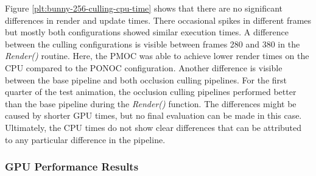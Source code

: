 \noindent
Figure \ref{plt:bunny-256-culling-cpu-time} shows that there are no significant differences in render and update times.
There occasional spikes in different frames but mostly both configurations showed similar execution times. A difference 
between the culling configurations is visible between frames 280 and 380 in the \emph{Render()} routine. Here, the 
\ac{PMOC} was able to achieve lower render times on the \ac{CPU} compared to the \ac{PONOC} configuration. Another 
difference is visible between the base pipeline and both occlusion culling pipelines. For the first quarter of the test 
animation, the occlusion culling pipelines performed better than the base pipeline during the \emph{Render()} function.
The differences might be caused by shorter \ac{GPU} times, but no final evaluation can be made in this case. Ultimately, 
the \ac{CPU} times do not show clear differences that can be attributed to any particular difference in the pipeline.

\subsubsection*{GPU Performance Results} \label{subsubsec-gpu-performance-results-bunny}

